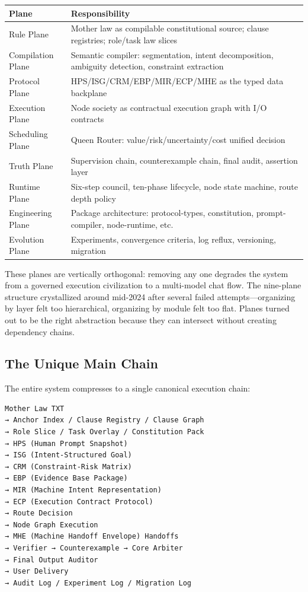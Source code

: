 \documentclass[12pt,a4paper]{article}
\begin{document}
\begin{table}[htbp]
\centering
\small
\begin{tabular}{ll}
\toprule
Plane & Responsibility \\
\midrule
Rule Plane & Mother law as compilable constitutional source; clause registries; role/task law slices \\
Compilation Plane & Semantic compiler: segmentation, intent decomposition, ambiguity detection, constraint extraction \\
Protocol Plane & HPS/ISG/CRM/EBP/MIR/ECP/MHE as the typed data backplane \\
Execution Plane & Node society as contractual execution graph with I/O contracts \\
Scheduling Plane & Queen Router: value/risk/uncertainty/cost unified decision \\
Truth Plane & Supervision chain, counterexample chain, final audit, assertion layer \\
Runtime Plane & Six-step council, ten-phase lifecycle, node state machine, route depth policy \\
Engineering Plane & Package architecture: protocol-types, constitution, prompt-compiler, node-runtime, etc. \\
Evolution Plane & Experiments, convergence criteria, log reflux, versioning, migration \\
\bottomrule
\end{tabular}
\end{table}


These planes are vertically orthogonal: removing any one degrades the system from a governed execution civilization to a multi-model chat flow. The nine-plane structure crystallized around mid-2024 after several failed attempts---organizing by layer felt too hierarchical, organizing by module felt too flat. Planes turned out to be the right abstraction because they can intersect without creating dependency chains.

\subsection{The Unique Main Chain}


The entire system compresses to a single canonical execution chain:

\begin{verbatim}
Mother Law TXT
→ Anchor Index / Clause Registry / Clause Graph
→ Role Slice / Task Overlay / Constitution Pack
→ HPS (Human Prompt Snapshot)
→ ISG (Intent-Structured Goal)
→ CRM (Constraint-Risk Matrix)
→ EBP (Evidence Base Package)
→ MIR (Machine Intent Representation)
→ ECP (Execution Contract Protocol)
→ Route Decision
→ Node Graph Execution
→ MHE (Machine Handoff Envelope) Handoffs
→ Verifier → Counterexample → Core Arbiter
→ Final Output Auditor
→ User Delivery
→ Audit Log / Experiment Log / Migration Log
\end{verbatim}
\end{document}
